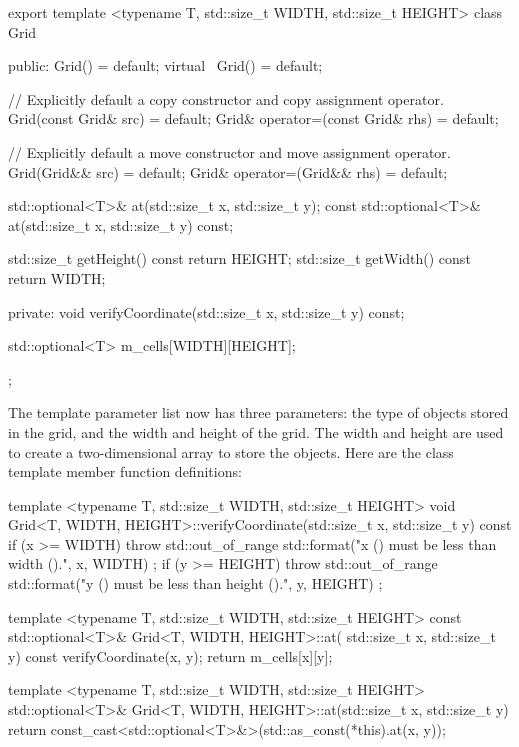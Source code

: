 \begin{cpp}
export template <typename T, std::size_t WIDTH, std::size_t HEIGHT>
class Grid
{
    public:
        Grid() = default;
        virtual ~Grid() = default;

        // Explicitly default a copy constructor and copy assignment operator.
        Grid(const Grid& src) = default;
        Grid& operator=(const Grid& rhs) = default;

        // Explicitly default a move constructor and move assignment operator.
        Grid(Grid&& src) = default;
        Grid& operator=(Grid&& rhs) = default;

        std::optional<T>& at(std::size_t x, std::size_t y);
        const std::optional<T>& at(std::size_t x, std::size_t y) const;

        std::size_t getHeight() const { return HEIGHT; }
        std::size_t getWidth() const { return WIDTH; }

    private:
        void verifyCoordinate(std::size_t x, std::size_t y) const;

        std::optional<T> m_cells[WIDTH][HEIGHT];
};
\end{cpp}

The template parameter list now has three parameters: the type of objects stored in the grid, and the width and height of the grid. The width and height are used to create a two-dimensional array to store the objects. Here are the class template member function definitions:

\begin{cpp}
template <typename T, std::size_t WIDTH, std::size_t HEIGHT>
void Grid<T, WIDTH, HEIGHT>::verifyCoordinate(std::size_t x, std::size_t y) const
{
    if (x >= WIDTH) {
        throw std::out_of_range {
            std::format("x ({}) must be less than width ({}).", x, WIDTH) };
    }
    if (y >= HEIGHT) {
        throw std::out_of_range {
            std::format("y ({}) must be less than height ({}).", y, HEIGHT) };
    }
}

template <typename T, std::size_t WIDTH, std::size_t HEIGHT>
const std::optional<T>& Grid<T, WIDTH, HEIGHT>::at(
    std::size_t x, std::size_t y) const
{
    verifyCoordinate(x, y);
    return m_cells[x][y];
}

template <typename T, std::size_t WIDTH, std::size_t HEIGHT>
std::optional<T>& Grid<T, WIDTH, HEIGHT>::at(std::size_t x, std::size_t y)
{
    return const_cast<std::optional<T>&>(std::as_const(*this).at(x, y));
}
\end{cpp}

